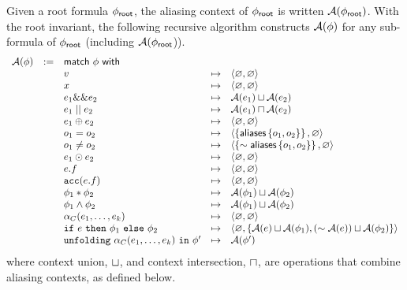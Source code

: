 Given a root formula $\phi_\textsf{root}$, the aliasing context of $\phi_\textsf{root}$ is written $\mathcal{A}(\phi_\textsf{root})$. With the root invariant, the following recursive algorithm constructs $\mathcal{A}(\phi)$ for any sub-formula of $\phi_\textsf{root}$ (including $\mathcal{A}(\phi_\textsf{root}$)).
%
\begin{align*}
\begin{array}{rclcl}
\A(\phi) &:=& \tsf{match} \ \phi \ \tsf{with} \\
&& v &\mt&
  \context{\empty}{\empty}
\\
&& x &\mt&
  \context{\empty}{\empty}
\\
&& e_1 \band e_2 &\mt&
  \A(e_1) \contextunion \A(e_2)
\\
&& e_1 \bor e_2 &\mt&
  \A(e_1) \contextintersection \A(e_2)
\\
&& e_1 \oplus e_2 &\mt&
  \context{\empty}{\empty}
\\
&& o_1 = o_2 &\mt&
  \context{\set{\aliases\set{o_1, o_2}}}{\empty} %
\\
&& o_1 \neq o_2 &\mt&
  \context{\set{\pnot \aliases\set{o_1, o_2}}}{\empty}
\\
&& e_1 \odot e_2 &\mt&
  \context{\empty}{\empty}
\\
&& e.f &\mt&
  \context{\empty}{\empty}
\\
&& \cacc(e.f) &\mt&
  \context{\empty}{\empty}
\\
&& \phi_1 \ast \phi_2 &\mt&
  \A(\phi_1) \contextunion \A(\phi_2)
\\
&& \phi_1 \land \phi_2 &\mt&
  \A(\phi_1) \contextunion \A(\phi_2)
\\
&& \alpha_C(e_1, \dots, e_k) &\mt&
  \context{\empty}{\empty}
\\
&& \cif \ e \ \cthen \ \phi_1 \ \celse \ \phi_2 &\mt&
  \context{\empty}{\set{ \A(e) \contextunion \A(\phi_1), (\pnot \A(e)) \contextunion \A(\phi_2) }}
\\
&& \cunfolding \ \alpha_C(e_1, \dots, e_k) \ \cin \ \phi\p &\mt&
  \A(\phi\p)
\end{array}
\end{align*}
%
where context union, $\sqcup$, and context intersection, $\sqcap$, are operations that combine aliasing contexts, as defined below.
%
